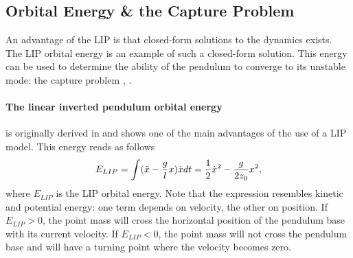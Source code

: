 \subsection{Orbital Energy \& the Capture Problem}\label{sec:ewalking}
An advantage of the \ac{LIP} is that closed-form solutions to the dynamics exists. The \ac{LIP} orbital energy is an example of such a closed-form solution. This energy can be used to determine the ability of the pendulum to converge to its unstable mode: the capture problem \cite{pratt2006capture}, \cite{koolen2012capturability}.

\paragraph{The linear inverted pendulum orbital energy}\label{subsec:liporbit} is originally derived in \cite{kajita1992dynamic} and shows one of the main advantages of the use of a \ac{LIP} model.  This energy reads as follows
\begin{equation}
E_{LIP} = \int (\ddot{x}-\frac{g}{l}x)\dot{x} dt = \frac{1}{2}\dot{x}^2-\frac{g}{2z_0}x^2,
\label{eq:Elip}
\end{equation}
where $E_{LIP}$ is the \ac{LIP} orbital energy. Note that the expression resembles kinetic and potential energy: one term depends on velocity, the other on position. If $E_{LIP}>0$, the point mass will cross the horizontal position of the pendulum base with its current velocity. If $E_{LIP}<0$, the point mass will not cross the pendulum base and will have a turning point where the velocity becomes zero.

